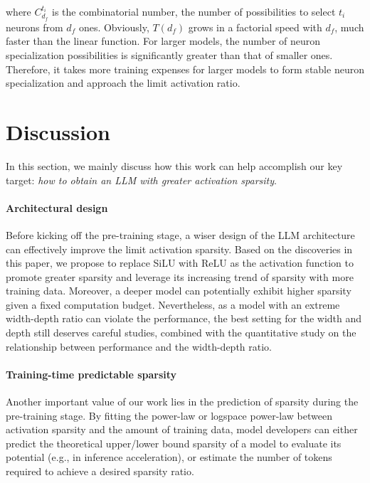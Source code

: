 \documentclass{article} %
\begin{document}
where $C_{d_f}^{t_i}$ is the combinatorial number, the number of possibilities to select $t_i$ neurons from $d_f$ ones. Obviously, $T(d_f)$ grows in a factorial speed with $d_f$, much faster than the linear function. For larger models, the number of neuron specialization possibilities is significantly greater than that of smaller ones. Therefore, it takes more training expenses for larger models to form stable neuron specialization and approach the limit activation ratio.


\section{Discussion}

In this section, we mainly discuss how this work can help accomplish our key target: \textit{how to obtain an LLM with greater activation sparsity}.

\paragraph{Architectural design} Before kicking off the pre-training stage, a wiser design of the LLM architecture can effectively improve the limit activation sparsity. Based on the discoveries in this paper, we propose to replace SiLU with ReLU as the activation function to promote greater sparsity and leverage its increasing trend of sparsity with more training data. Moreover, a deeper model can potentially exhibit higher sparsity given a fixed computation budget. Nevertheless, as a model with an extreme width-depth ratio can violate the performance, the best setting for the width and depth still deserves careful studies, combined with the quantitative study on the relationship between performance and the width-depth ratio.

\paragraph{Training-time predictable sparsity} Another important value of our work lies in the prediction of sparsity during the pre-training stage. By fitting the power-law or logspace power-law between activation sparsity and the amount of training data, model developers can either predict the theoretical upper/lower bound sparsity of a model to evaluate its potential (e.g., in inference acceleration), or estimate the number of tokens required to achieve a desired sparsity ratio.
\end{document}
